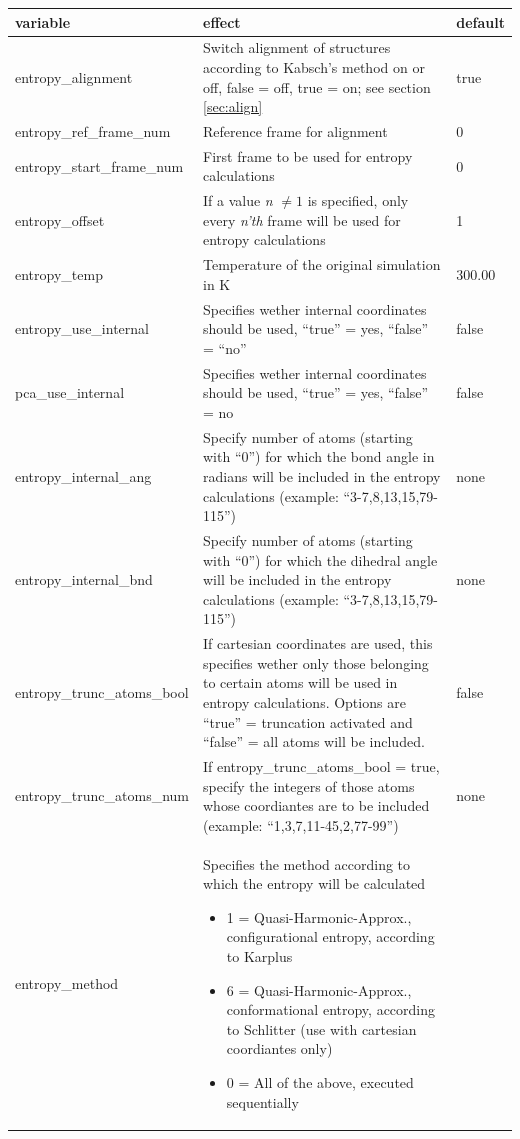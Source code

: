 \documentclass[10pt,a4paper]{article} %
\begin{document}
	\begin{longtable}{|p{4cm}|p{5cm}|p{2cm}|}
		variable & effect & default\\
		\hline
		entropy\_alignment & Switch alignment of structures according to Kabsch's method\cite{kabsch1, kabsch2} on or off, false = off, true = on; see section \ref{sec:align} & true\\
		entropy\_ref\_frame\_num & Reference frame for alignment & 0 \\
		entropy\_start\_frame\_num & First frame to be used for entropy calculations & 0 \\
		entropy\_offset & If a value \textit{n} $\neq 1$ is specified, only every \textit{n'th} frame will be used for entropy calculations & 1 \\
		entropy\_temp & Temperature of the original simulation in K & 300.00 \\
		entropy\_use\_internal & Specifies wether internal coordinates should be used, ``true'' = yes, ``false'' = ``no'' & false \\
		pca\_use\_internal & Specifies wether internal coordinates should be used, ``true'' = yes, ``false'' = no & false \\
		entropy\_internal\_ang & Specify number of atoms (starting with ``0'') for which the bond angle in radians will be included in the entropy calculations (example: ``3-7,8,13,15,79-115'') & none\\
		entropy\_internal\_bnd & Specify number of atoms (starting with ``0'') for which the dihedral angle will be included in the entropy calculations (example: ``3-7,8,13,15,79-115'') & none\\
		entropy\_trunc\_atoms\_bool & If cartesian coordinates are used, this specifies wether only those belonging to certain atoms will be used in entropy calculations. Options are ``true'' = truncation activated and ``false'' = all atoms will be included. & false\\
		entropy\_trunc\_atoms\_num & If entropy\_trunc\_atoms\_bool = true, specify the integers of those atoms whose coordiantes are to be included (example: ``1,3,7,11-45,2,77-99'') & none\\
		entropy\_method & Specifies the method according to which the entropy will be calculated 
		\begin{itemize}
		\item 1 = Quasi-Harmonic-Approx., configurational entropy, according to Karplus\supercite{karplus_entropy}
		\item 6 = Quasi-Harmonic-Approx., conformational entropy, according to Schlitter\supercite{schlitter_entropy} (use with cartesian coordiantes only)
		\item 0 = All of the above, executed sequentially
		\end{itemize}\\
		
	\end{longtable}
		
\end{document}
